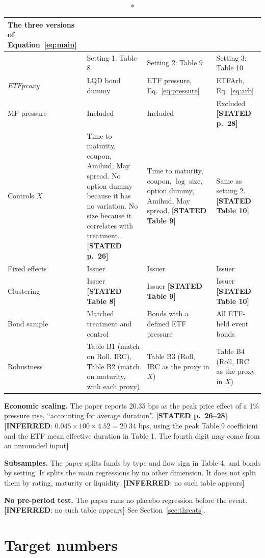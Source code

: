 \documentclass[10pt,a4paper]{article}
\newcommand{\ST}[1]{\textcolor{cst}{\textbf{[STATED #1]}}}
\newcommand{\IN}[1]{\textcolor{cin}{\textbf{[INFERRED}: #1\textbf{]}}}
\begin{document}
\begin{longtable}{@{}P{2.2cm}P{4.3cm}P{5.2cm}P{5.3cm}@{}}
\caption*{\textbf{The three versions of Equation~\eqref{eq:main}}}\\
\toprule
& Setting 1: Table 8 & Setting 2: Table 9 & Setting 3: Table 10\\
\midrule\endhead
$\mathit{ETFproxy}$ & LQD bond dummy & ETF pressure, Eq.~\eqref{eq:pressure} & ETFArb, Eq.~\eqref{eq:arb}\\
MF pressure & Included & Included & Excluded \ST{p.~28}\\
Controls $X$ & Time to maturity, coupon, Amihud, May spread. No option dummy because it has no variation. No size because it correlates with treatment. \ST{p.~26} & Time to maturity, coupon, $\log$ size, option dummy, Amihud, May spread. \ST{Table 9} & Same as setting 2. \ST{Table 10}\\
Fixed effects & Issuer & Issuer & Issuer\\
Clustering & Issuer \ST{Table 8} & Issuer \ST{Table 9} & Issuer \ST{Table 10}\\
Bond sample & Matched treatment and control & Bonds with a defined ETF pressure & All ETF-held event bonds\\
Robustness & Table B1 (match on Roll, IRC), Table B2 (match on maturity, with each proxy) & Table B3 (Roll, IRC as the proxy in $X$) & Table B4 (Roll, IRC as the proxy in $X$)\\
\bottomrule
\end{longtable}

\textbf{Economic scaling.} The paper reports 20.35 bps as the peak price effect of a 1\% pressure rise, ``accounting for average duration''. \ST{p.~26--28} \IN{$0.045\times 100\times 4.52=20.34$ bps, using the peak Table 9 coefficient and the ETF mean effective duration in Table 1. The fourth digit may come from an unrounded input}

\textbf{Subsamples.} The paper splits funds by type and flow sign in Table 4, and bonds by setting. It splits the main regressions by no other dimension. It does not split them by rating, maturity or liquidity. \IN{no such table appears}

\textbf{No pre-period test.} The paper runs no placebo regression before the event. \IN{no such table appears} See Section~\ref{sec:threats}.

\section{Target numbers}\label{sec:targets}
\end{document}
